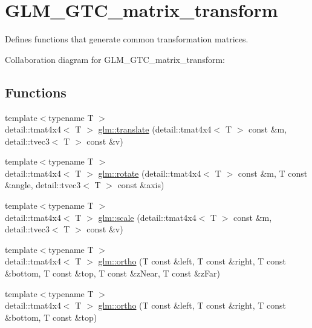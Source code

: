 \hypertarget{group__gtc__matrix__transform}{}\section{G\+L\+M\+\_\+\+G\+T\+C\+\_\+matrix\+\_\+transform}
\label{group__gtc__matrix__transform}


Defines functions that generate common transformation matrices.  


Collaboration diagram for G\+L\+M\+\_\+\+G\+T\+C\+\_\+matrix\+\_\+transform\+:
\subsection*{Functions}
\begin{DoxyCompactItemize}
\item 
{\footnotesize template$<$typename T $>$ }\\detail\+::tmat4x4$<$ T $>$ \hyperlink{group__gtc__matrix__transform_ga8925161ecc1767957900c5ca8b922dc4}{glm\+::translate} (detail\+::tmat4x4$<$ T $>$ const \&m, detail\+::tvec3$<$ T $>$ const \&v)
\item 
{\footnotesize template$<$typename T $>$ }\\detail\+::tmat4x4$<$ T $>$ \hyperlink{group__gtc__matrix__transform_gaacb9cbe8f93a8fef9dc3e25559df19c0}{glm\+::rotate} (detail\+::tmat4x4$<$ T $>$ const \&m, T const \&angle, detail\+::tvec3$<$ T $>$ const \&axis)
\item 
{\footnotesize template$<$typename T $>$ }\\detail\+::tmat4x4$<$ T $>$ \hyperlink{group__gtc__matrix__transform_ga223e08009f1cab54651200b81e91981c}{glm\+::scale} (detail\+::tmat4x4$<$ T $>$ const \&m, detail\+::tvec3$<$ T $>$ const \&v)
\item 
{\footnotesize template$<$typename T $>$ }\\detail\+::tmat4x4$<$ T $>$ \hyperlink{group__gtc__matrix__transform_gaf039a9f8d24e4bf39d30b7d692c1b8c3}{glm\+::ortho} (T const \&left, T const \&right, T const \&bottom, T const \&top, T const \&z\+Near, T const \&z\+Far)
\item 
{\footnotesize template$<$typename T $>$ }\\detail\+::tmat4x4$<$ T $>$ \hyperlink{group__gtc__matrix__transform_gac7cbb65a7853eb6db00d46125595b732}{glm\+::ortho} (T const \&left, T const \&right, T const \&bottom, T const \&top)
\item 

\end{DoxyCompactItemize}
